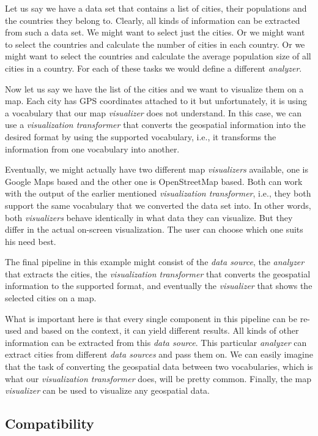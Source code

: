 Let us say we have a data set that contains a list of cities,  their populations and the countries they belong to. Clearly, all kinds of information can be extracted from such a data set. We might want to select just the cities. Or we might want to select the countries and calculate the number of cities in each country. Or we might want to select the countries and calculate the average population size of all cities in a country. For each of these tasks we would define a different \emph{analyzer}.

Now let us say we have the list of the cities and we want to visualize them on a map. Each city has GPS coordinates attached to it but unfortunately, it is using a vocabulary that our map \emph{visualizer} does not understand. In this case, we can use a \emph{visualization transformer} that converts the geospatial information into the desired format by using the supported vocabulary, i.e., it transforms the information from one vocabulary into another.

Eventually, we might actually have two different map \emph{visualizers} available, one is Google Maps based and the other one is OpenStreetMap based. Both can work with the output of the earlier mentioned \emph{visualization transformer}, i.e., they both support the same vocabulary that we converted the data set into. In other words, both \emph{visualizers} behave identically in what data they can visualize. But they differ in the actual on-screen visualization. The user can choose which one suits his need best.

The final pipeline in this example might consist of the \emph{data source}, the \emph{analyzer} that extracts the cities, the \emph{visualization transformer} that converts the geospatial information to the supported format, and eventually the \emph{visualizer} that shows the selected cities on a map.

What is important here is that every single component in this pipeline can be re-used and based on the context, it can yield different results. All kinds of other information can be extracted from this \emph{data source}. This particular \emph{analyzer} can extract cities from different \emph{data sources} and pass them on. We can easily imagine that the task of converting the geospatial data between two vocabularies, which is what our \emph{visualization transformer} does, will be pretty common. Finally, the map \emph{visualizer} can be used to visualize any geospatial data.

\subsection{Compatibility}

